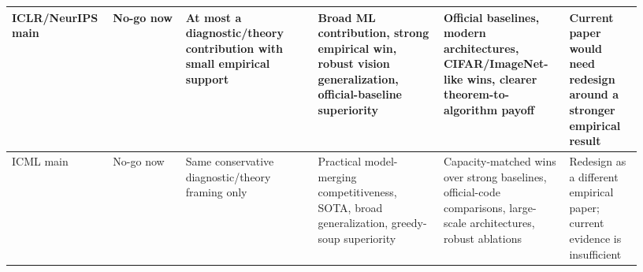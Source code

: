 \begin{table}[t]
\begin{tabular}{p{0.13\linewidth}p{0.11\linewidth}p{0.20\linewidth}p{0.19\linewidth}p{0.19\linewidth}p{0.11\linewidth}}
\hline
ICLR/NeurIPS main & No-go now & At most a diagnostic/theory contribution with small empirical support & Broad ML contribution, strong empirical win, robust vision generalization, official-baseline superiority & Official baselines, modern architectures, CIFAR/ImageNet-like wins, clearer theorem-to-algorithm payoff & Current paper would need redesign around a stronger empirical result \\
\hline
ICML main & No-go now & Same conservative diagnostic/theory framing only & Practical model-merging competitiveness, SOTA, broad generalization, greedy-soup superiority & Capacity-matched wins over strong baselines, official-code comparisons, large-scale architectures, robust ablations & Redesign as a different empirical paper; current evidence is insufficient \\
\hline
\end{tabular}
\end{table}
